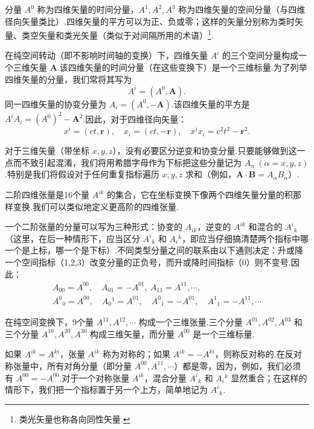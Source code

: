 分量 $A^0$ 称为四维矢量的时间分量，$A^1,A^2,A^3$ 称为四维矢量的空间分量（与四维径向矢量类比）.四维矢量的平方可以为正、负或零；这样的矢量分别称为类时矢量、类空矢量和类光矢量（类似于对间隔所用的术语）\footnote{类光矢量也称各向同性矢量.}.

在纯空间转动（即不影响时间轴的变换）下，四维矢量 $A^i$ 的三个空间分量构成一个三维矢量 $\boldsymbol{A}$.该四维矢量的时间分量（在这些变换下）是一个三维标量.为了列举四维矢量的分量，我们常将其写为
\begin{equation*}
  A^i=(A^0,\boldsymbol{A}).
\end{equation*}
同一四维矢量的协变分量为 $A_i=(A^0,-\boldsymbol{A})$.该四维矢量的平方是 $A^iA_i=(A^0)^2-\boldsymbol{A}^2$.因此，对于四维径向矢量：
\begin{equation*}
  x^i=(ct,\boldsymbol{r}),\quad x_i=(ct,-\boldsymbol{r}),\quad
  x^ix_i=c^2t^2-\boldsymbol{r}^2.
\end{equation*}

对于三维矢量（带坐标 $x,y,z$），没有必要区分逆变和协变分量.只要能够做到这一点而不致引起混淆，我们将用希腊字母作为下标把这些分量记为 $A_\alpha\ (\alpha=x,y,z)$.特别是我们将假设对于任何重复指标遍历 $x,y,z$ 求和（例如，$\boldsymbol{A}\cdot\boldsymbol{B}=A_\alpha B_\alpha$）.

二阶四维张量是16个量 $A^{ik}$ 的集合，它在坐标变换下像两个四维矢量分量的积那样变换.我们可以类似地定义更高阶的四维张量.

一个二阶张量的分量可以写为三种形式：协变的 $A_{ik}$，逆变的 $A^{ik}$ 和混合的 $A^i{}_k$（这里，在后一种情形下，应当区分 $A^i{}_k$ 和 $A_i{}^k$，即应当仔细搞清楚两个指标中哪一个是上标，哪一个是下标）.不同类型分量之间的联系由以下通则决定：升或降一个空间指标（1,2,3）改变分量的正负号，而升或降时间指标（0）则不变号.因此：
\begin{equation*}
\begin{gathered}
  A_{00}=A^{00},\quad A_{01}=-A^{01},\ A_{11}=A^{11},\cdots,\\
  A^0{}_0=A^{00},\quad A_0{}^1=A^{01},\quad A^0{}_1=-A^{01},\quad
  A^1{}_1=-A^{11},\cdots
\end{gathered}
\end{equation*}

在纯空间变换下，9个量 $A^{11},A^{12},\cdots$ 构成一个三维张量.三个分量 $A^{01},A^{02},A^{03}$ 和三个分量 $A^{10},A^{20},A^{30}$ 构成三维矢量，而分量 $A^{00}$ 是一个三维标量.

如果 $A^{ik}=A^{ki}$，张量 $A^{ik}$ 称为对称的；如果 $A^{ik}=-A^{ki}$，则称反对称的.在反对称张量中，所有对角分量（即分量 $A^{00},A^{11},\cdots$）都是零，因为，例如，我们必须有 $A^{00}=-A^{00}$.对于一个对称张量 $A^{ik}$，混合分量 $A^i{}_k$ 和 $A_i{}^k$ 显然重合；在这样的情形下，我们把一个指标置于另一个上方，简单地记为 $A^i{}_k$.


